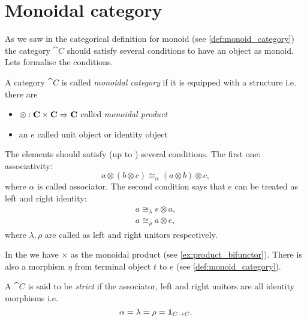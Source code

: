 \section{Monoidal category}
As we saw in the categorical definition for monoid (see
\cref{def:monoid_category}) the category $\cat{C}$ should satisfy
several conditions to have an object as monoid. Lets formalise the conditions.
\begin{definition}
\label{def:monoidal_category}
A category $\cat{C}$ is called \textit{monoidal category} if it is
equipped with a  structure i.e. there are
\begin{itemize}
\item {} $\otimes: \mathbf{C} \times \mathbf{C} \Rightarrow
  \mathbf{C}$ called \textit{monoidal product}  
\item an  $e$ called unit object or identity object
\end{itemize}

The elements should satisfy (up to )
several conditions. The first one:
associativity: 
\begin{equation}
a \otimes \left( b \otimes c \right) \cong_\alpha
  \left( a \otimes b \right) \otimes c,
\nonumber
\end{equation}
where $\alpha$ is called associator. 
The second condition says that
$e$ can be treated as left and right identity: 
\begin{eqnarray}
a \cong_\lambda e \otimes a, 
\nonumber \\
a \cong_\rho a \otimes e,
\nonumber
\end{eqnarray}
where $\lambda, \rho$ are called as left and right unitors respectively.  
\end{definition}

In the  we have $\times$ as the monoidal
product (see \cref{ex:product_bifunctor}). There is also a
morphism $\eta$ from terminal object $t$ to $e$
\cite{bib:stackexchange:terminalinmonoid} (see \cref{def:monoid_category}). 

\begin{definition}
\label{def:strict_monoidal_category}
A  $\cat{C}$ is said to be \textit{strict} if the
associator, left and right unitors are all identity morphisms i.e.
\[
\alpha = \lambda = \rho = \mathbf{1}_{ C \to C }.
\]
 
\end{definition}

